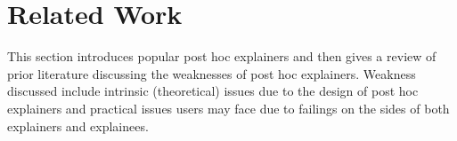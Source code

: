 \documentclass[11pt]{article}    %
\begin{document}
\section{Related Work}
    \label{sec:related_work}
    This section introduces popular post hoc explainers and then gives a review of prior literature discussing the weaknesses of post hoc explainers. Weakness discussed include intrinsic (theoretical) issues due to the design of post hoc explainers and practical issues users may face due to failings on the sides of both explainers and explainees. %

\end{document}
